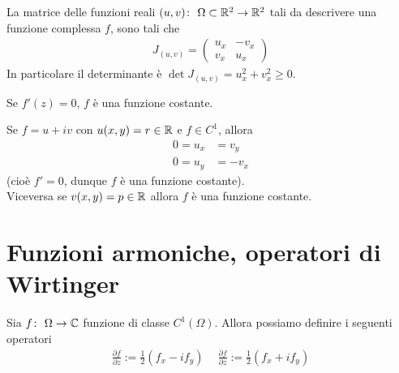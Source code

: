 \begin{corollary}
	La matrice delle funzioni reali $(u,v) \colon\ \Omega \subset \mathbb{R}^2 \rightarrow \mathbb{R}^2$ tali da descrivere una funzione complessa $f$, sono tali che  
	\begin{equation*}
	\begin{aligned}
		J_{(u,v)} = \left( \begin{array}{cc}
					u_x & - v_x\\ v_x & u_x
					\end{array} \right)
	\end{aligned}
	\end{equation*}
	In particolare il determinante è $\det J_{(u,v)} = u^2_x + v^2_x \ge 0$.
\end{corollary}

\begin{corollary}
	Se $f'(z) = 0$, $f$ è una funzione costante.
\end{corollary}

\begin{corollary}
	Se $f = u + iv$ con $u(x,y) = r \in \mathbb{R}$ e $f \in C^1$, allora 
	\begin{equation*} \begin{aligned}
	0 = u_x &= v_y \\
	0 = u_y &= -v_x
	 \end{aligned}\end{equation*}
	 (cioè $f' = 0$, dunque $f$ è una funzione costante). \\ Viceversa se $v(x,y) = p \in \mathbb{R}$ allora $f$ è una funzione costante.   
\end{corollary}

\section{Funzioni armoniche, operatori di Wirtinger}

\begin{definition}
	Sia $f \colon\ \Omega \rightarrow \mathbb{C}$ funzione di classe $C^1(\Omega)$. Allora possiamo definire i seguenti operatori
	\begin{equation}
	\begin{aligned}
		\frac{\partial f}{\partial z} := \frac{1}{2}(f_x - if_y) \quad\ \frac{\partial f}{\partial \overline{z}} := \frac{1}{2}(f_x + if_y)
	\end{aligned}
	\end{equation}
\end{definition}

